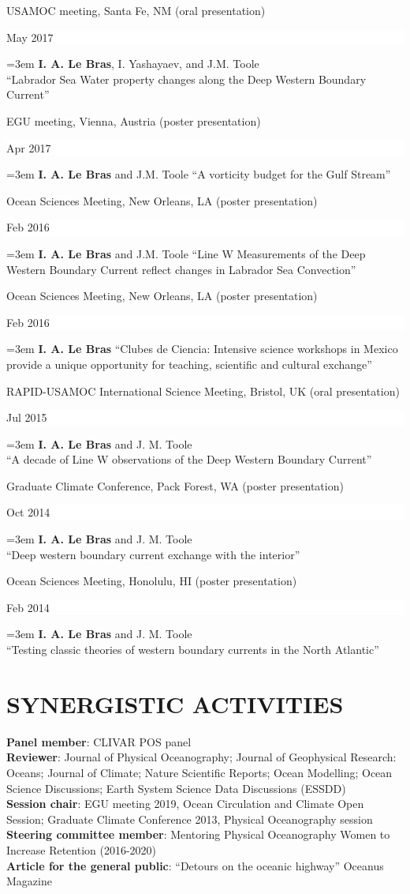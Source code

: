 \documentclass[paper=letter,fontsize=11pt]{scrartcl} %
\newcommand{\sepspace}{\vspace*{3mm}}		%
\newcommand{\NewPart}[2]{\section*{\uppercase{#1} #2}}
\newcommand{\ShortEntry}[2]{\normalsize \noindent \textbf{#1}: #2 \\ }
\newcommand{\ConfEntry}[5]{
		\noindent #1 (#2) \hfill      %
		\colorbox{White}{%
			\parbox{6em}{%
			\hfill\color{Black}#3}} \par %
		\noindent \hangindent=3em\hangafter=0 #4 ``#5'' \sepspace}
\begin{document}
\ConfEntry{USAMOC meeting, Santa Fe, NM}{oral presentation}{May 2017}{\textbf{I. A. Le Bras}, I. Yashayaev, and J.M. Toole\\}{Labrador Sea Water property changes along the Deep Western Boundary Current}

\ConfEntry{EGU meeting, Vienna, Austria}{poster presentation}{Apr 2017}{\textbf{I. A. Le Bras} and J.M. Toole}{A vorticity budget for the Gulf Stream}

\ConfEntry{Ocean Sciences Meeting, New Orleans, LA}{poster presentation}{Feb 2016}{\textbf{I. A. Le Bras} and J.M. Toole}{Line W Measurements of the Deep Western Boundary Current reflect changes in Labrador Sea Convection}

\ConfEntry{Ocean Sciences Meeting, New Orleans, LA}{poster presentation}{Feb 2016}{\textbf{I. A. Le Bras}}{Clubes de Ciencia: Intensive science workshops in Mexico provide a unique opportunity for teaching, scientific and cultural exchange}

\ConfEntry{RAPID-USAMOC International Science Meeting, Bristol, UK}{oral presentation}{Jul 2015}{\textbf{I. A. Le Bras} and J. M. Toole\\}{A decade of Line W observations of the Deep Western Boundary Current}

\ConfEntry{Graduate Climate Conference, Pack Forest, WA}{poster presentation}{Oct 2014}{\textbf{I. A. Le Bras} and J. M. Toole\\}{Deep western boundary current exchange with the interior}

\ConfEntry{Ocean Sciences Meeting, Honolulu, HI}{poster presentation}{Feb 2014}{\textbf{I. A. Le Bras} and J. M. Toole\\}{Testing classic theories of western boundary currents in the North Atlantic}

\NewPart{Synergistic Activities}{}
\ShortEntry{Panel member}{CLIVAR POS panel}
\ShortEntry{Reviewer}{Journal of Physical Oceanography; Journal of Geophysical Research: Oceans; Journal of Climate; Nature Scientific Reports; Ocean Modelling; Ocean Science Discussions; Earth System Science Data Discussions (ESSDD)}
\ShortEntry{Session chair}{EGU meeting 2019, Ocean Circulation and Climate Open Session; Graduate Climate Conference 2013, Physical Oceanography session}
\ShortEntry{Steering committee member}{Mentoring Physical Oceanography Women to Increase Retention (2016-2020)}
\ShortEntry{Article for the general public}{ ``Detours on the oceanic highway'' Oceanus Magazine}
\end{document}
